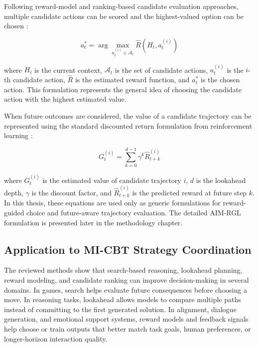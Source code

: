 Following reward-model and ranking-based candidate evaluation approaches, multiple candidate actions can be scored and the highest-valued option can be chosen \cite{ouyang2022training,cobbe2021training,jiang2023llmblender}:

\begin{equation}
a_t^* = \arg\max_{a_t^{(i)} \in \mathcal{A}_t} \hat{R}(H_t, a_t^{(i)})
\label{eq:generic-reward-guided-choice}
\end{equation}

where $H_t$ is the current context, $\mathcal{A}_t$ is the set of candidate actions, $a_t^{(i)}$ is the $i$-th candidate action, $\hat{R}$ is the estimated reward function, and $a_t^*$ is the chosen action. This formulation represents the general idea of choosing the candidate action with the highest estimated value.

When future outcomes are considered, the value of a candidate trajectory can be represented using the standard discounted return formulation from reinforcement learning \cite{sutton2018reinforcement}:

\begin{equation}
G_t^{(i)} = \sum_{k=0}^{d-1} \gamma^k \hat{R}_{t+k}^{(i)}
\label{eq:generic-cumulative-reward}
\end{equation}

where $G_t^{(i)}$ is the estimated value of candidate trajectory $i$, $d$ is the lookahead depth, $\gamma$ is the discount factor, and $\hat{R}_{t+k}^{(i)}$ is the predicted reward at future step $k$. In this thesis, these equations are used only as generic formulations for reward-guided choice and future-aware trajectory evaluation. The detailed AIM-RGL formulation is presented later in the methodology chapter.

\subsection{Application to MI-CBT Strategy Coordination}

The reviewed methods show that search-based reasoning, lookahead planning, reward modeling, and candidate ranking can improve decision-making in several domains. In games, search helps evaluate future consequences before choosing a move. In reasoning tasks, lookahead allows models to compare multiple paths instead of committing to the first generated solution. In alignment, dialogue generation, and emotional support systems, reward models and feedback signals help choose or train outputs that better match task goals, human preferences, or longer-horizon interaction quality.

